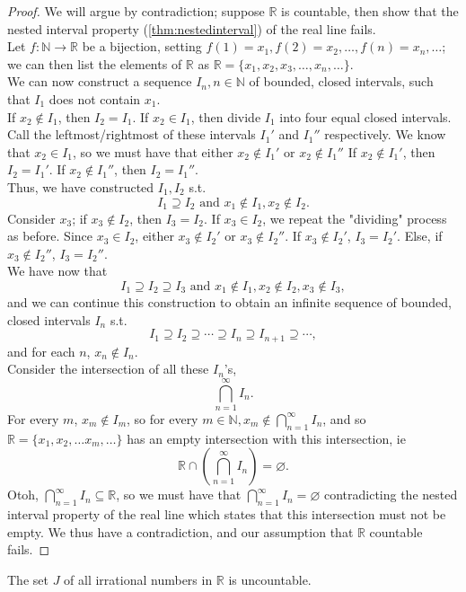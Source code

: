 \documentclass[12pt]{article}
\begin{document}
\begin{proof}
  We will argue by contradiction; suppose $\mathbb{R}$ is countable, then show that the nested interval property (\cref{thm:nestedinterval}) of the real line fails.\\
  Let $f: \mathbb{N} \to \mathbb{R}$ be a bijection, setting $f(1) = x_1, f(2) = x_2, \dots, f(n) = x_n, \dots$; we can then list the elements of $\mathbb{R}$ as $\mathbb{R} = \{x_1, x_2, x_3, \dots, x_n, \dots\}$.\\
  We can now construct a sequence $I_n, n \in \mathbb{N}$ of bounded, closed intervals, such that $I_1$ does not contain $x_1$.\\ If $x_2 \notin I_1$, then $I_2 = I_1$. If $x_2 \in I_1$, then divide $I_1$ into four equal closed intervals.\\
  Call the leftmost/rightmost of these intervals $I_1'$ and $I_1''$ respectively. We know that $x_2 \in I_1$, so we must have that either $x_2 \notin I_1'$ or $x_2 \notin I_1''$ If $x_2 \notin I_1'$, then $I_2 = I_1'$. If $x_2 \notin I_1''$, then $I_2 = I_1''$.\\
  Thus, we have constructed $I_1, I_2$ s.t.\[I_1 \supseteq I_2 \text{ and } x_1 \notin I_1,x_2 \notin I_2.\] Consider $x_3$; if $x_3 \notin I_2$, then $I_3 = I_2$. If $x_3 \in I_2$, we repeat the "dividing" process as before. Since $x_3 \in I_2$, either $x_3 \notin I_2'$ or $x_3 \notin I_2''$. If $x_3 \notin I_2'$, $I_3 = I_2'$. Else, if $x_3 \notin I_2''$, $I_3 = I_2''$.\\
  We have now that \[I_1 \supseteq I_2 \supseteq I_3 \text{ and } x_1 \notin I_1, x_2 \notin I_2, x_3 \notin I_3,\] and we can continue this construction to obtain an infinite sequence of bounded, closed intervals $I_n$ s.t. $$I_1 \supseteq I_2 \supseteq \cdots \supseteq I_n \supseteq I_{n+1} \supseteq \cdots,$$ and for each $n$, $x_n \notin I_n$.\\
  Consider the intersection of all these $I_n$'s,$$\bigcap_{n=1}^\infty I_n.$$ For every $m$, $x_m \notin I_m$, so for every $m \in \mathbb{N}, x_m \notin \bigcap_{n=1}^\infty I_n$, and so $\mathbb{R} = \{x_1, x_2, \dots x_m, \dots\}$ has an empty intersection with this intersection, ie
  $$\mathbb{R} \cap \left( \bigcap_{n=1}^\infty I_n \right) = \varnothing.$$ Otoh, $\bigcap_{n=1}^\infty I_n \subseteq \mathbb{R}$, so we must have that $\bigcap_{n=1}^\infty I_n = \varnothing$ contradicting the nested interval property of the real line which states that this intersection must not be empty. We thus have a contradiction, and our assumption that $\mathbb{R}$ countable fails. \footnotemark
\end{proof}
\begin{proposition}
  The set $J$ of all irrational numbers in $\mathbb{R}$ is uncountable.
\end{proposition}
\end{document}
